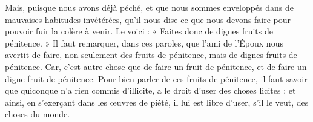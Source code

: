 Mais, puisque nous avons déjà péché, et que nous sommes enveloppés dans de mauvaises habitudes invétérées, qu’il nous dise ce que nous devons faire pour pouvoir fuir la colère à venir. Le voici : « Faites donc de dignes fruits de pénitence. » Il faut remarquer, dans ces paroles, que l’ami de l’Époux nous avertit de faire, non seulement des fruits de pénitence, mais de dignes fruits de pénitence. Car, c’est autre chose que de faire un fruit de pénitence, et de faire un digne fruit de pénitence. Pour bien parler de ces fruits de pénitence, il faut savoir que quiconque n’a rien commis d’illicite, a le droit d’user des choses licites : et ainsi, en s’exerçant dans les œuvres de piété, il lui est libre d’user, s’il le veut, des choses du monde.
